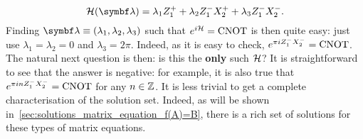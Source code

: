 \begin{example}[label=ex:eigendecomposition_cnot]
\begin{equation}
    \calH(\bs\lambda) = \lambda_1 Z_1^+ + \lambda_2 Z_1^- X_2^+ + \lambda_3 Z_1^- X_2^-.
\end{equation}
Finding $\bs\lambda\equiv(\lambda_1,\lambda_2,\lambda_3)$ such that $e^{i{\mathcal{H}}}=\operatorname{CNOT}$ is then quite easy: just use $\lambda_1=\lambda_2=0$ and $\lambda_3=2\pi$. Indeed, as it is easy to check, $e^{\pi i Z_1^- X_2^-} = \operatorname{CNOT}$.
The natural next question is then: is this the \textbf{only} such ${\mathcal{H}}$? It is straightforward to see that the answer is negative: for example, it is also true that $e^{\pi i n Z_1^- X_2^-}=\operatorname{CNOT}$ for any $n\in\mathbb{Z}$.
It is less trivial to get a complete characterisation of the solution set.
Indeed, as will be shown in~\cref{sec:solutions_matrix_equation_f(A)=B}, there is a rich set of solutions for these types of matrix equations.
\end{example}

